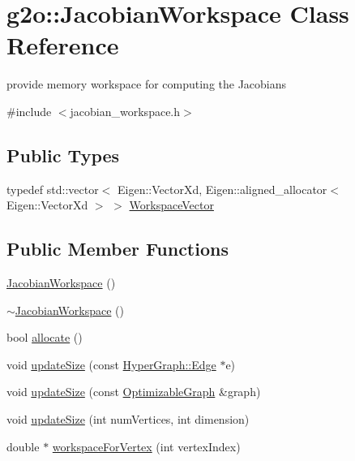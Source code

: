 \hypertarget{classg2o_1_1JacobianWorkspace}{}\section{g2o\+:\+:Jacobian\+Workspace Class Reference}
\label{classg2o_1_1JacobianWorkspace}


provide memory workspace for computing the Jacobians  




{\ttfamily \#include $<$jacobian\+\_\+workspace.\+h$>$}

\subsection*{Public Types}
\begin{DoxyCompactItemize}
\item 
typedef std\+::vector$<$ Eigen\+::\+Vector\+Xd, Eigen\+::aligned\+\_\+allocator$<$ Eigen\+::\+Vector\+Xd $>$ $>$ \hyperlink{classg2o_1_1JacobianWorkspace_aee9d767fa1208772a3de83732646e182}{Workspace\+Vector}
\end{DoxyCompactItemize}
\subsection*{Public Member Functions}
\begin{DoxyCompactItemize}
\item 
\hyperlink{classg2o_1_1JacobianWorkspace_a6c20de27401a40e620ee065c80d24b9e}{Jacobian\+Workspace} ()
\item 
\hyperlink{classg2o_1_1JacobianWorkspace_a0d00e42f6e048268ff5005b8e3f578dd}{$\sim$\+Jacobian\+Workspace} ()
\item 
bool \hyperlink{classg2o_1_1JacobianWorkspace_a8e1d23ced91b721fdb5bd68c8c4e9fc3}{allocate} ()
\item 
void \hyperlink{classg2o_1_1JacobianWorkspace_a2d16ad6db1a51aa93c806cc9c06e223f}{update\+Size} (const \hyperlink{classg2o_1_1HyperGraph_1_1Edge}{Hyper\+Graph\+::\+Edge} $\ast$e)
\item 
void \hyperlink{classg2o_1_1JacobianWorkspace_ae3d715bd25e196d8db81661ef0fbd09b}{update\+Size} (const \hyperlink{structg2o_1_1OptimizableGraph}{Optimizable\+Graph} \&graph)
\item 
void \hyperlink{classg2o_1_1JacobianWorkspace_aa15a007fee3037116ea0e857855080d2}{update\+Size} (int num\+Vertices, int dimension)
\item 
double $\ast$ \hyperlink{classg2o_1_1JacobianWorkspace_ad68c37d7779d3a034bc1b864cd98690b}{workspace\+For\+Vertex} (int vertex\+Index)
\end{DoxyCompactItemize}
